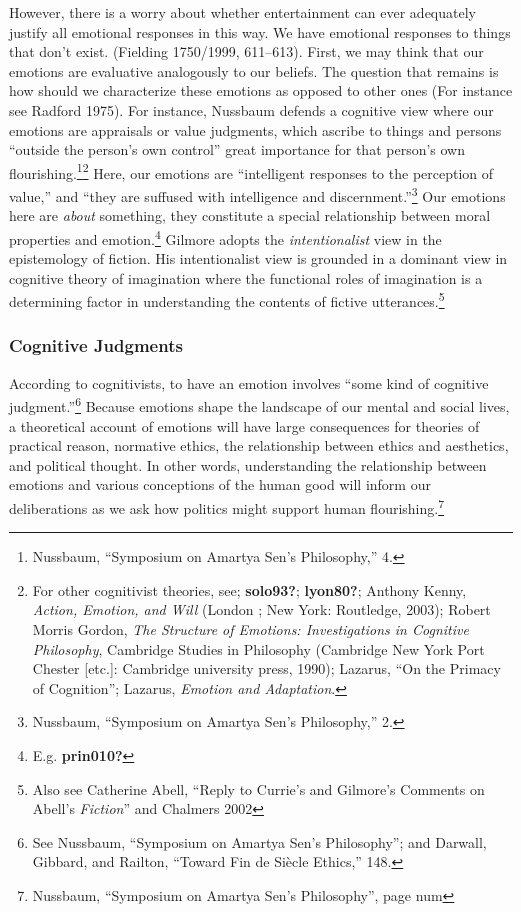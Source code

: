 \documentclass[phdthesis,12pt,final]{wuthesis}
\theoremstyle{definition}
\theoremstyle{definition}
\theoremstyle{definition}
\theoremstyle{definition}
\theoremstyle{remark}
\begin{document}
However, there is a worry about whether entertainment can ever adequately justify all emotional responses in this way. We have emotional responses to things that don't exist. (Fielding 1750/1999, 611--613). First, we may think that our emotions are evaluative analogously to our beliefs. The question that remains is how should we characterize these emotions as opposed to other ones (For instance see Radford 1975). For instance, Nussbaum defends a cognitive view where our emotions are appraisals or value judgments, which ascribe to things and persons ``outside the person's own control'' great importance for that person's own flourishing.\footnote{Nussbaum, {``Symposium on {Amartya Sen}'s Philosophy,''} 4.}\footnote{For other cognitivist theories, see; \textbf{solo93?}; \textbf{lyon80?}; Anthony Kenny, \emph{Action, Emotion, and Will} (London ; New York: Routledge, 2003); Robert Morris Gordon, \emph{The Structure of Emotions: Investigations in Cognitive Philosophy}, Cambridge Studies in Philosophy (Cambridge New York Port Chester {[}etc.{]}: Cambridge university press, 1990); Lazarus, {``On the {Primacy} of {Cognition}''}; Lazarus, \emph{Emotion and Adaptation}.} Here, our emotions are ``intelligent responses to the perception of value,'' and ``they are suffused with intelligence and discernment.''\footnote{Nussbaum, {``Symposium on {Amartya Sen}'s Philosophy,''} 2.} Our emotions here are \emph{about} something, they constitute a special relationship between moral properties and emotion.\footnote{E.g. \textbf{prin010?}} Gilmore adopts the \emph{intentionalist} view in the epistemology of fiction. His intentionalist view is grounded in a dominant view in cognitive theory of imagination where the functional roles of imagination is a determining factor in understanding the contents of fictive utterances.\footnote{Also see Catherine Abell, {``Reply to {Currie}'s and {Gilmore}'s Comments on {Abell}'s {\emph{Fiction}}''} and Chalmers 2002}

\subsubsection*{Cognitive Judgments}\label{cognitive-judgments}

According to cognitivists, to have an emotion involves ``some kind of cognitive judgment.''\footnote{See Nussbaum, {``Symposium on {Amartya Sen}'s Philosophy''}; and Darwall, Gibbard, and Railton, {``Toward Fin de Siècle Ethics,''} 148.} Because emotions shape the landscape of our mental and social lives, a theoretical account of emotions will have large consequences for theories of practical reason, normative ethics, the relationship between ethics and aesthetics, and political thought. In other words, understanding the relationship between emotions and various conceptions of the human good will inform our deliberations as we ask how politics might support human flourishing.\footnote{Nussbaum, {``Symposium on {Amartya Sen}'s Philosophy''}, page num}
\end{document}
